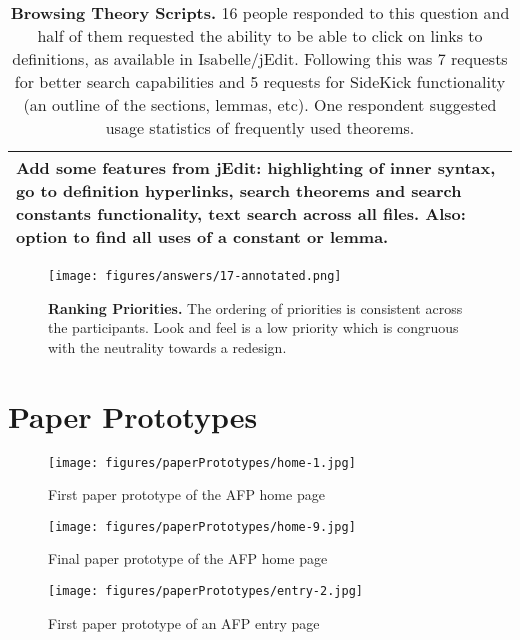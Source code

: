 \documentclass[bsc,frontabs,oneside,singlespacing,parskip,deptreport,logo]{infthesis}
\begin{document}
\begin{table}[h!]
\begin{tabularx}{\textwidth}{X}
\footnotesize
Add some features from jEdit: highlighting of inner syntax, go to definition hyperlinks, search theorems and search constants functionality, text search across all files. Also: option to find all uses of a   constant or lemma.\\
\hline
\end{tabularx}
\vspace{0.3cm}
\caption{\textbf{Browsing Theory Scripts.}
    16 people responded to this question and half of them requested the ability to be able to click on links to definitions, as available in Isabelle/jEdit. Following this was 7 requests for better search capabilities and 5 requests for SideKick functionality (an outline of the sections, lemmas, etc). One respondent suggested usage statistics of frequently used theorems.}
    \label{fig:theory-scripts-2}
\end{table}

\begin{figure}[h]
    \centering
    \texttt{[image: figures/answers/17-annotated.png]}
    \caption{\textbf{Ranking Priorities.}
    The ordering of priorities is consistent across the participants. Look and feel is a low priority which is congruous with the neutrality towards a redesign.}
    \label{fig:ranking-priorities}
\end{figure}

\clearpage

\chapter{Paper Prototypes}

\begin{figure}[h]
    \centering
    \texttt{[image: figures/paperPrototypes/home-1.jpg]}
    \caption{First paper prototype of the AFP home page}

\end{figure}

\begin{figure}[h]
    \centering
    \texttt{[image: figures/paperPrototypes/home-9.jpg]}
    \caption{Final paper prototype of the AFP home page}

\end{figure}

\begin{figure}[h]
    \centering
    \texttt{[image: figures/paperPrototypes/entry-2.jpg]}
    \caption{First paper prototype of an AFP entry page}

\end{figure}
\end{document}
